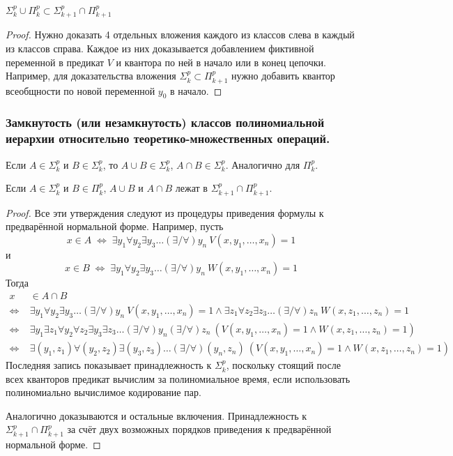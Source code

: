 \begin{statement}
    $\Sigma_k^p \cup \Pi_{k}^p \subset \Sigma_{k+1}^p \cap \Pi_{k+1}^p$
\end{statement}

\begin{proof}
Нужно доказать 4 отдельных вложения каждого из классов
слева в каждый из классов справа. Каждое из них доказывается добавлением
фиктивной переменной в предикат $V$ и квантора по ней в начало или в конец
цепочки. Например, для доказательства вложения $\Sigma_k^p \subset \Pi_{k+1}^p$ нужно добавить
квантор всеобщности по новой переменной $y_0$ в начало.
\end{proof}

\subsubsection{Замкнутость (или незамкнутость) классов полиномиальной иерархии относительно теоретико-множественных операций.}

\begin{statement}
Если $A \in \Sigma_k^p$ и $B \in \Sigma_k^p$, то $A\cup B \in  \Sigma_k^p$, $A\cap B \in \Sigma_k^p$. Аналогично для $\Pi_k^p$.

Если $A \in \Sigma_k^p$ и $B \in \Pi_k^p$, $A\cup B$ и $A\cap B$ лежат в $\Sigma_{k+1}^p \cap \Pi_{k+1}^p$.
\end{statement}

\begin{proof}
Все эти утверждения следуют из процедуры приведения формулы к предварённой нормальной форме. Например, пусть
$$x \in A \; \Leftrightarrow \; \exists y_1 \forall y_2 \exists y_3 \ldots (\exists / \forall) y_n \ V(x, y_1,\ldots ,x_n) = 1$$
и
$$x \in B \; \Leftrightarrow \; \exists y_1 \forall y_2 \exists y_3 \ldots (\exists / \forall) y_n \ W(x, y_1,\ldots ,x_n) = 1$$
Тогда
\begin{align*}
    x & \in A\cap B \\
    \Leftrightarrow \; & \exists y_1 \forall y_2 \exists y_3 \ldots (\exists / \forall) y_n \ V(x, y_1,\ldots ,x_n) = 1 \wedge \exists z_1 \forall z_2 \exists z_3 \ldots (\exists / \forall) z_n \ W(x, z_1,\ldots ,z_n) = 1 \\
    \Leftrightarrow \; & \exists y_1 \exists z_1 \forall y_2 \forall z_2 \exists y_3 \exists z_3 \ldots (\exists / \forall) y_n (\exists / \forall) z_n \ \left(V\left(x, y_1,\ldots ,x_n\right) = 1 \wedge  W\left(x, z_1,\ldots ,z_n\right) = 1 \right) \\
    \Leftrightarrow \; & \exists (y_1, z_1) \forall (y_2, z_2) \exists (y_3, z_3) \ldots (\exists / \forall) (y_n, z_n) \ \left(V\left(x, y_1,\ldots ,x_n\right) = 1 \wedge  W\left(x, z_1,\ldots ,z_n\right) = 1 \right)
\end{align*}
Последняя запись показывает принадлежность к $\Sigma_k^p$, поскольку стоящий после
всех кванторов предикат вычислим за полиномиальное время, если использовать полиномиально вычислимое кодирование пар.

Аналогично доказываются и остальные включения. Принадлежность к $\Sigma_{k+1}^p \cap \Pi_{k+1}^p$ за счёт двух возможных порядков приведения к предварённой нормальной
форме.
\end{proof}

